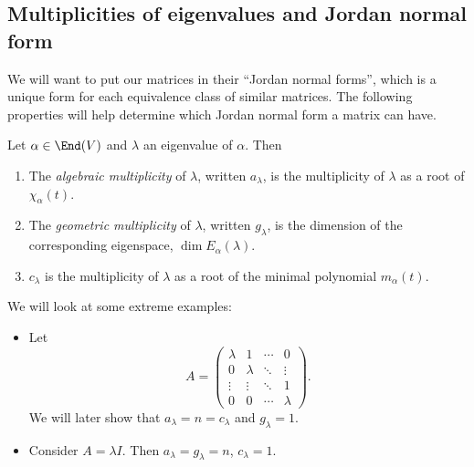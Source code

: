 \documentclass[a4paper]{article}
\begin{document}
\subsection{Multiplicities of eigenvalues and Jordan normal form}
We will want to put our matrices in their ``Jordan normal forms'', which is a unique form for each equivalence class of similar matrices. The following properties will help determine which Jordan normal form a matrix can have.
\begin{defi}
  Let $\alpha \in \End (V)$ and $\lambda$ an eigenvalue of $\alpha$. Then
  \begin{enumerate}
    \item The \emph{algebraic multiplicity} of $\lambda$, written $a_\lambda$, is the multiplicity of $\lambda$ as a root of $\chi_\alpha(t)$.
    \item The \emph{geometric multiplicity} of $\lambda$, written $g_\lambda$, is the dimension of the corresponding eigenspace, $\dim E_\alpha(\lambda)$.
    \item $c_\lambda$ is the multiplicity of $\lambda$ as a root of the minimal polynomial $m_\alpha(t)$.
  \end{enumerate}
\end{defi}

We will look at some extreme examples:
\begin{eg}\leavevmode
  \begin{itemize}
    \item Let
      \[
        A =
        \begin{pmatrix}
          \lambda & 1 & \cdots & 0\\
          0 & \lambda & \ddots & \vdots\\
          \vdots & \vdots & \ddots & 1\\
          0 & 0 & \cdots & \lambda
        \end{pmatrix}.
      \]
      We will later show that $a_\lambda = n = c_\lambda$ and $g_\lambda = 1$.
    \item Consider $A = \lambda I$. Then $a_\lambda = g_\lambda = n$, $c_\lambda = 1$.
  \end{itemize}
\end{eg}
\end{document}
